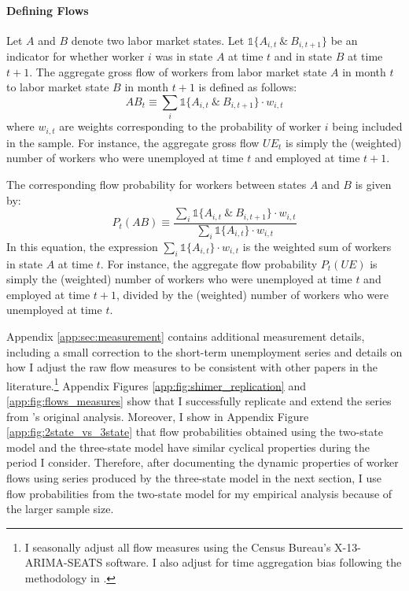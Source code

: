 \documentclass[12pt]{article}
\begin{document}
\paragraph{Defining Flows} Let $A$ and $B$ denote two labor market states. Let $\mathds{1}\{A_{i,t} \ \& \ B_{i,t+1}\}$ be an indicator for whether worker $i$ was in state $A$ at time $t$ and in state $B$ at time $t+1$. The aggregate gross flow of workers from labor market state $A$ in month $t$ to labor market state $B$ in month $t+1$ is defined as follows:
$$AB_t \equiv \sum_i \mathds{1}\{A_{i,t} \ \& \ B_{i,t+1}\} \cdot w_{i,t} $$
where $w_{i,t}$ are weights corresponding to the probability of worker $i$ being included in the sample. For instance, the aggregate gross flow $UE_t$ is simply the (weighted) number of workers who were unemployed at time $t$ and employed at time $t+1$.

The corresponding flow probability for workers between states $A$ and $B$ is given by:
$$P_t(AB) \equiv \frac{\sum_i \mathds{1}\{A_{i,t} \ \& \ B_{i,t+1}\} \cdot w_{i,t}}{\sum_i \mathds{1}\{A_{i,t}\} \cdot w_{i,t}}$$
In this equation, the expression $\sum_i \mathds{1}\{A_{i,t}\} \cdot w_{i,t}$ is the weighted sum of workers in state $A$ at time $t$. For instance, the aggregate flow probability $P_t(UE)$ is simply the (weighted) number of workers who were unemployed at time $t$ and employed at time $t+1$, divided by the (weighted) number of workers who were unemployed at time $t$. 

Appendix \ref{app:sec:measurement} contains additional measurement details, including a small correction to the short-term unemployment series and details on how I adjust the raw flow measures to be consistent with other papers in the literature.\footnote{I seasonally adjust all flow measures using the Census Bureau's X-13-ARIMA-SEATS software. I also adjust for time aggregation bias following the methodology in \cite{Shimer:2012aa}.} Appendix Figures \ref{app:fig:shimer_replication} and \ref{app:fig:flows_measures} show that I successfully replicate and extend the series from \cite{Shimer:2012aa}'s original analysis. Moreover, I show in Appendix Figure \ref{app:fig:2state_vs_3state} that flow probabilities obtained using the two-state model and the three-state model have similar cyclical properties during the period I consider. Therefore, after documenting the dynamic properties of worker flows using series produced by the three-state model in the next section, I use flow probabilities from the two-state model for my empirical analysis because of the larger sample size.
\end{document}
